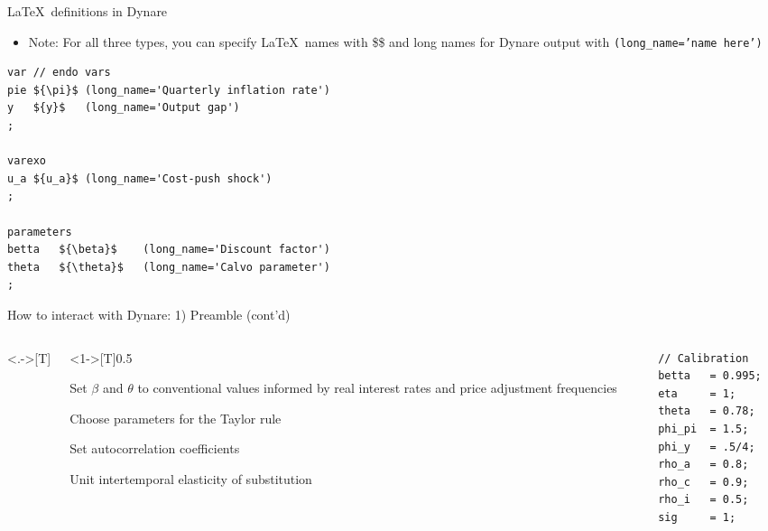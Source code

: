 \documentclass[handout,usepdftitle=false,xcolor=dvipsnames,aspectratio=169]{beamer}
\begin{document}
\begin{frame}[fragile]{\LaTeX\ definitions in Dynare}
\begin{itemize}
	\item Note: For all three types, you can specify \LaTeX\ names with \$\$ and long names for Dynare output with \texttt{(long\_name='name here')}
\end{itemize}

\begin{verbatim}
var // endo vars
pie ${\pi}$ (long_name='Quarterly inflation rate')
y   ${y}$   (long_name='Output gap')
;

varexo
u_a ${u_a}$ (long_name='Cost-push shock')
;

parameters
betta   ${\beta}$    (long_name='Discount factor')
theta   ${\theta}$   (long_name='Calvo parameter')
;
\end{verbatim}
\end{frame}


\begin{frame}[fragile]{How to interact with Dynare: 1) Preamble (cont'd)}
\begin{columns}<.->[T] %
\begin{column}<1->[T]{0.5\textwidth}
	    \begin{witemize}
	        \item Set $\beta$ and $\theta$ to conventional values informed by real interest rates and price adjustment frequencies
	        \item Choose parameters for the Taylor rule
	        \item Set autocorrelation coefficients
	        \item Unit intertemporal elasticity of substitution
	    \end{witemize}
\end{column}
\begin{column}[T]{0.5\textwidth}
\begin{verbatim}
// Calibration
betta   = 0.995;
eta     = 1;
theta   = 0.78;
phi_pi  = 1.5;
phi_y   = .5/4;
rho_a   = 0.8;
rho_c   = 0.9;
rho_i   = 0.5;
sig     = 1;
\end{verbatim}
\end{column}
\end{columns}
\end{frame}
\end{document}
